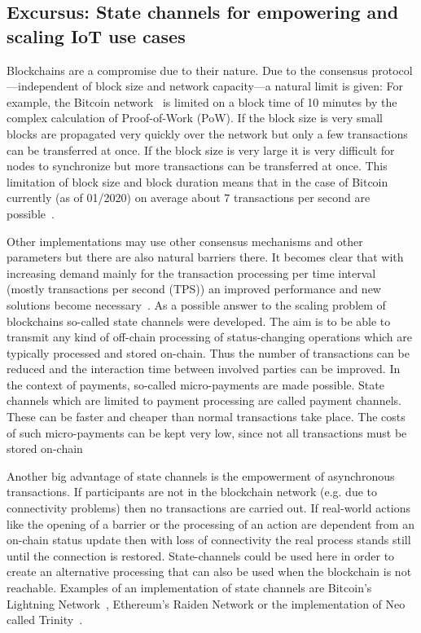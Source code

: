 \documentclass[conference]{IEEEtran}
\begin{document}
%
\subsection{Excursus: State channels for empowering and scaling IoT use cases}

Blockchains are a compromise due to their nature. Due to the consensus protocol---independent of block size and network capacity---a natural limit is given: For example, the Bitcoin network~\cite{nakamoto2009} is limited on a block time of 10 minutes by the complex calculation of Proof-of-Work (PoW). If the block size is very small blocks are propagated very quickly over the network but only a few transactions can be transferred at once. If the block size is very large it is very difficult for nodes to synchronize but more transactions can be transferred at once. This limitation of block size and block duration means that in the case of Bitcoin currently (as of 01/2020) on average about 7 transactions per second are possible~\cite{Macdonald2017}.

Other implementations may use other consensus mechanisms and other parameters but there are also natural barriers there. It becomes clear that with increasing demand mainly for the transaction processing per time interval (mostly transactions per second (TPS)) an improved performance and new solutions become necessary~\cite{Macdonald2017}. As a possible answer to the scaling problem of blockchains so-called state channels were developed. The aim is to be able to transmit any kind of off-chain processing of status-changing operations which are typically processed and stored on-chain. Thus the number of transactions can be reduced and the interaction time between involved parties can be improved. In the context of payments, so-called micro-payments are made possible. State channels which are limited to payment processing are called payment channels. These can be faster and cheaper than normal transactions take place. The costs of such micro-payments can be kept very low, since not all transactions must be stored on-chain~\cite{Coleman2018}

Another big advantage of state channels is the empowerment of asynchronous transactions. If participants are not in the blockchain network (e.g. due to connectivity problems) then no transactions are carried out. If real-world actions like the opening of a barrier or the processing of an action are dependent from an on-chain status update then with loss of connectivity the real process stands still until the connection is restored. State-channels could be used here in order to create an alternative processing that can also be used when the blockchain is not reachable. Examples of an implementation of state channels are Bitcoin's Lightning Network~\cite{Lightning2016}, Ethereum's Raiden Network or the implementation of Neo called Trinity~\cite{Trinity2018}.
\end{document}

